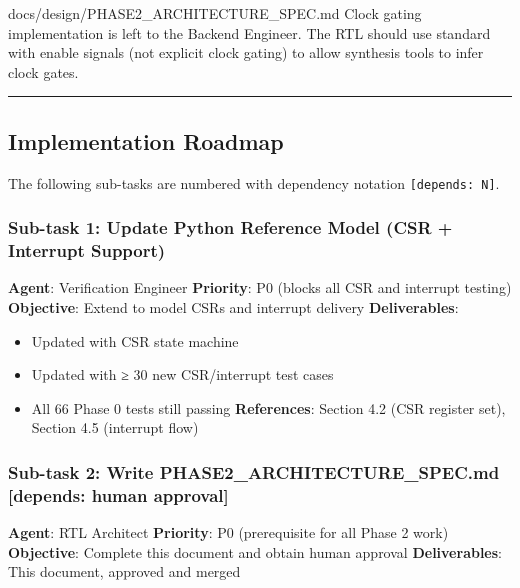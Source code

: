 \begin{relocated}{docs/design/PHASE2_ARCHITECTURE_SPEC.md}
Clock gating implementation is left to the Backend Engineer. The RTL
should use standard  with enable signals (not explicit
clock gating) to allow synthesis tools to infer clock gates.

\begin{center}\rule{0.5\linewidth}{0.5pt}\end{center}

\subsection{Implementation Roadmap}\label{ds:ch:phase2-architecture:9-implementation-roadmap}

The following sub-tasks are numbered with dependency notation
\texttt{[depends:\allowbreak{}\ N]}.

\subsubsection{Sub-task 1: Update Python Reference Model (CSR +
Interrupt Support)}\label{ds:ch:phase2-architecture:sub-task-1-update-python-reference-model-csr-interrupt-support}

\textbf{Agent}: Verification Engineer \textbf{Priority}: P0 (blocks all
CSR and interrupt testing) \textbf{Objective}: Extend
 to model CSRs and interrupt delivery
\textbf{Deliverables}:

\begin{itemize}
\tightlist
\item
  Updated  with CSR state machine
\item
  Updated  with ≥ 30 new
  CSR/\allowbreak{}interrupt test cases
\item
  All 66 Phase 0 tests still passing \textbf{References}: Section 4.2
  (CSR register set), Section 4.5 (interrupt flow)
\end{itemize}

\subsubsection{\texorpdfstring{Sub-task 2: Write
PHASE2\_\allowbreak{}ARCHITECTURE\_\allowbreak{}SPEC.md {[}depends:
human
approval{]}}{Sub-task 2: Write \cref{ds:ch:phase2-architecture} {[}depends: human approval{]}}}\label{ds:ch:phase2-architecture:sub-task-2-write-phase2-architecture-specmd-depends-human-approval}

\textbf{Agent}: RTL Architect \textbf{Priority}: P0 (prerequisite for
all Phase 2 work) \textbf{Objective}: Complete this document and obtain
human approval \textbf{Deliverables}: This document, approved and merged


\end{relocated}
